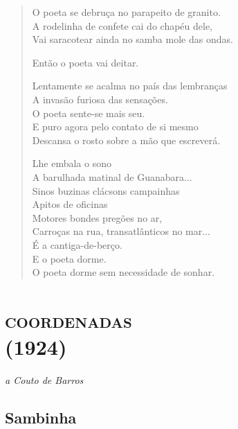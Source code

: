 \begin{verse}
O poeta se debruça no parapeito de granito.\\
A rodelinha de confete cai do chapéu dele,\\
Vai saracotear ainda no samba mole das ondas.

Então o poeta vai deitar.

Lentamente se acalma no país das lembranças\\
A invasão furiosa das sensações.\\
O poeta sente-se mais seu.\\
E puro agora pelo contato de si mesmo\\
Descansa o rosto sobre a mão que escreverá.

Lhe embala o sono\\
A barulhada matinal de Guanabara...\\
Sinos buzinas clácsons campainhas\\
Apitos de oficinas\\
Motores bondes pregões no ar,\\
Carroças na rua, transatlânticos no mar...\\
É a cantiga-de-berço.\\
E o poeta dorme.\\

O poeta dorme sem necessidade de sonhar.
\end{verse}

\chapter[\textsc{coordenadas}\\Sambinha]{\textsc{coordenadas}\\(1924)}

\hfill\emph{a Couto de Barros}

\section{Sambinha}

